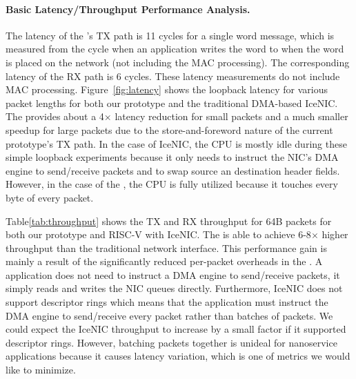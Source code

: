 \paragraph{Basic Latency/Throughput Performance Analysis.} The latency of the \name{}'s TX path is 11 cycles for a single word message, which is measured from the cycle when an application writes the word to when the word is placed on the network (not including the MAC processing).
The corresponding latency of the RX path is 6 cycles.
These latency measurements do not include MAC processing.
Figure~\ref{fig:latency} shows the loopback latency for various packet lengths for both our \name{} prototype and the traditional DMA-based IceNIC.
The \name{} provides about a 4$\times$ latency reduction for small packets and a much smaller speedup for large packets due to the store-and-foreword nature of the current \name{} prototype's TX path.
In the case of IceNIC, the CPU is mostly idle during these simple loopback experiments because it only needs to instruct the NIC's DMA engine to send/receive packets and to swap source an destination header fields.
However, in the case of the \name{}, the CPU is fully utilized because it touches every byte of every packet.

Table\ref{tab:throughput} shows the TX and RX throughput for 64B packets for both our \name{} prototype and RISC-V with IceNIC.
The \name{} is able to achieve 6-8$\times$ higher throughput than the traditional network interface.
This performance gain is mainly a result of the significantly reduced per-packet overheads in the \name{}.
A \name{} application does not need to instruct a DMA engine to send/receive packets, it simply reads and writes the NIC queues directly.
Furthermore, IceNIC does not support descriptor rings which means that the application must instruct the DMA engine to send/receive every packet rather than batches of packets.
We could expect the IceNIC throughput to increase by a small factor if it supported descriptor rings.
However, batching packets together is unideal for nanoservice applications because it causes latency variation, which is one of metrics we would like to minimize.


